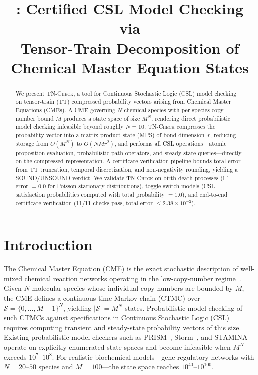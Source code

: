 \documentclass[11pt]{article}
\title{\tncheck{}: Certified CSL Model Checking via \\
Tensor-Train Decomposition of Chemical Master Equation States}
\date{}
\newcommand{\tncheck}{\textsc{TN-Check}}
\newcommand{\calS}{\mathcal{S}}
\begin{document}
\maketitle

\begin{abstract}
We present \tncheck{}, a tool for Continuous Stochastic Logic (CSL)
model checking on tensor-train (TT) compressed probability vectors
arising from Chemical Master Equations (CMEs).
A CME governing $N$ chemical species with per-species copy-number bound $M$
produces a state space of size $M^N$, rendering direct probabilistic
model checking infeasible beyond roughly $N=10$.
\tncheck{} compresses the probability vector into a matrix product state
(MPS) of bond dimension~$r$, reducing storage from $O(M^N)$ to $O(NMr^2)$,
and performs all CSL operations---atomic proposition evaluation,
probabilistic path operators, and steady-state queries---directly on
the compressed representation.
A certificate verification pipeline bounds total error from
TT truncation, temporal discretization, and non-negativity rounding,
yielding a SOUND/UNSOUND verdict.
We validate \tncheck{} on birth-death processes (L1 error $= 0.0$ for
Poisson stationary distributions), toggle switch models (CSL satisfaction
probabilities computed with total probability $=1.0$), and end-to-end
certificate verification (11/11 checks pass, total error
$\leq 2.38 \times 10^{-2}$).
\end{abstract}

\section{Introduction}\label{sec:intro}

The Chemical Master Equation (CME) is the exact stochastic description of
well-mixed chemical reaction networks operating in the low-copy-number
regime~\cite{gillespie1992,vanKampen2007}.
Given $N$ molecular species whose individual copy numbers are bounded by $M$,
the CME defines a continuous-time Markov chain (CTMC) over
$\calS = \{0,\ldots,M-1\}^N$, yielding $|\calS| = M^N$ states.
Probabilistic model checking of such CTMCs against specifications in
Continuous Stochastic Logic (CSL)~\cite{aziz2000} requires computing
transient and steady-state probability vectors of this size.
Existing probabilistic model checkers such as
PRISM~\cite{kwiatkowska2011}, Storm~\cite{hensel2022}, and
STAMINA~\cite{neupane2019} operate on explicitly enumerated state spaces
and become infeasible when $M^N$ exceeds $10^7$--$10^8$.
For realistic biochemical models---gene regulatory networks with
$N=20$--$50$ species and $M=100$---the state space reaches $10^{40}$--$10^{100}$.
\end{document}
